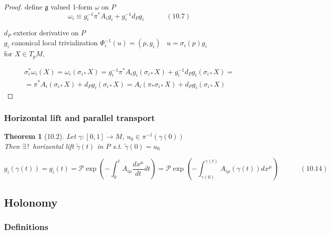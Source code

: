 \documentclass[twoside]{amsart}
\newtheorem{theorem}{Theorem}
\begin{document}
\begin{proof}
define $\mathfrak{g}$ valued 1-form $\omega$ on $P$ 
\begin{equation}
  \omega_i \equiv g_i^{-1} \pi^* A_i g_i + g_i^{-1} d_P g_i \quad \quad \quad \, (10.7)
\end{equation}

$d_P$ exterior derivative on $P$ \\

$g_i$ canonical local trivialization $\Phi_i^{-1}(u) = (p,g_i)$ \quad \, $u = \sigma_i(p)g_i$ \\

for $X \in T_pM$, 

\[
\begin{gathered}
  \sigma_i^*\omega_i(X) = \omega_i(\sigma_{i*}X) = g_i^{-1} \pi^* A_i g_i(\sigma_{i*} X) + g_i^{-1} d_P g_i(\sigma_{i*}X) = \\
  = \pi^*A_i(\sigma_{i*} X) + d_Pg_i(\sigma_{i*}X) = A_i(\pi_* \sigma_{i*}X) + d_Pg_i(\sigma_{i*} X)
\end{gathered}
\]
\end{proof}






\subsubsection{ Horizontal lift and parallel transport }

\begin{theorem}[10.2] Let $\gamma:[0,1] \to M$, $u_0 \in \pi^{-1}(\gamma(0))$ \\
Then $\exists \, ! \, $ horizontal lift $\widetilde{\gamma}(t)$ in $P$ s.t. $\widetilde{\gamma}{(0)} = u_0$ 
\end{theorem}



\begin{equation}
  g_i(\gamma(t)) = g_i(t) = \mathcal{P}\exp{ \left( -\int_0^t A_{i \mu} \frac{dx^{\mu} }{dt} dt \right) } = \mathcal{P}\exp{ \left( - \int_{\gamma(0)}^{\gamma(t)} A_{i\mu}(\gamma(t))dx^{\mu} \right) } \quad \quad \quad \, (10.14)
\end{equation}

\subsection{Holonomy}

\subsubsection{Definitions}
\end{document}
